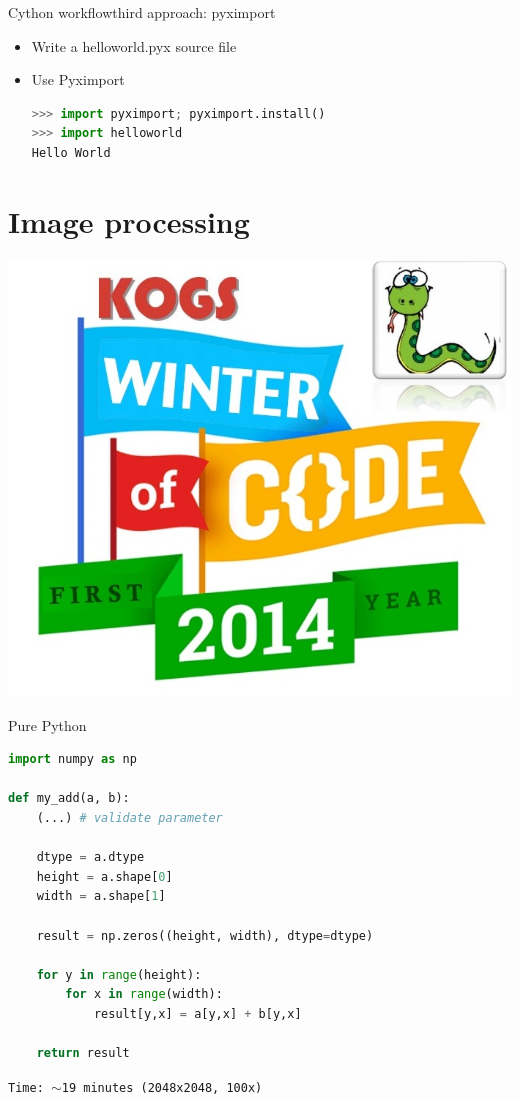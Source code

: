 \documentclass[dvipsnames]{beamer}
\begin{document}
\begin{frame}[fragile]{Cython workflow}{third approach: pyximport}
\begin{itemize}
\item Write a helloworld.pyx source file
\item Use Pyximport
\begin{lstlisting}[language=Python]
>>> import pyximport; pyximport.install()
>>> import helloworld
Hello World
\end{lstlisting}
\end{itemize}
\end{frame}

\section{Image processing}

\begin{frame}{}
\begin{center}\includegraphics[scale=0.42]{challenge.jpg}\end{center}
\end{frame}

\begin{frame}[fragile]{Pure Python}
\begin{lstlisting}[language=Python,caption={add1.py}]
import numpy as np

def my_add(a, b):
    (...) # validate parameter
	
    dtype = a.dtype
    height = a.shape[0]
    width = a.shape[1]

    result = np.zeros((height, width), dtype=dtype)

    for y in range(height):
        for x in range(width):
            result[y,x] = a[y,x] + b[y,x]

    return result
\end{lstlisting}
\pause
{\tt Time: $\sim$19 minutes (2048x2048, 100x)}
\end{frame}
\end{document}
